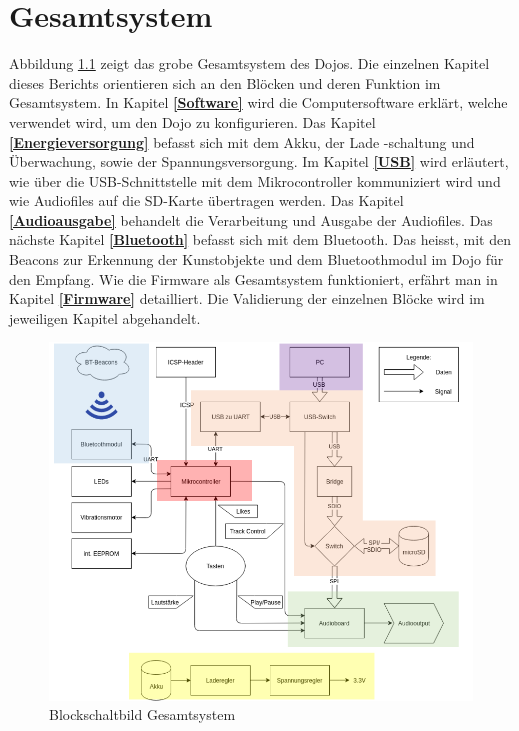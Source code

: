 \chapter{Gesamtsystem}
\thispagestyle{fancy} 





Abbildung \ref{Blockschaltbild_Gesamtsystem} zeigt das grobe Gesamtsystem des Dojos. Die einzelnen Kapitel dieses Berichts orientieren sich an den Blöcken und deren Funktion im Gesamtsystem. In Kapitel \textbf{\ref{Software} } wird die Computersoftware erklärt, welche verwendet wird, um den Dojo zu konfigurieren. Das Kapitel \textbf{\ref{Energieversorgung} } befasst sich mit dem Akku, der Lade -schaltung und Überwachung, sowie der Spannungsversorgung. Im Kapitel \textbf{\ref{USB} } wird erläutert, wie über die USB-Schnittstelle mit dem Mikrocontroller kommuniziert wird und wie Audiofiles auf die SD-Karte übertragen werden. Das Kapitel \textbf{\ref{Audioausgabe} } behandelt die Verarbeitung und Ausgabe der Audiofiles. Das nächste Kapitel \textbf{\ref{Bluetooth} } befasst sich mit dem Bluetooth. Das heisst, mit den Beacons zur Erkennung der Kunstobjekte und dem Bluetoothmodul im Dojo für den Empfang. Wie die Firmware als Gesamtsystem funktioniert, erfährt man in Kapitel \textbf{\ref{Firmware} } detailliert. Die Validierung der einzelnen Blöcke wird im jeweiligen Kapitel abgehandelt.

\begin{figure}[h]
	\centering
	\includegraphics[width=14cm]{Bilder/Gesamtsystem.png}
	\caption{Blockschaltbild Gesamtsystem}
	\label{Blockschaltbild_Gesamtsystem}
\end{figure}


